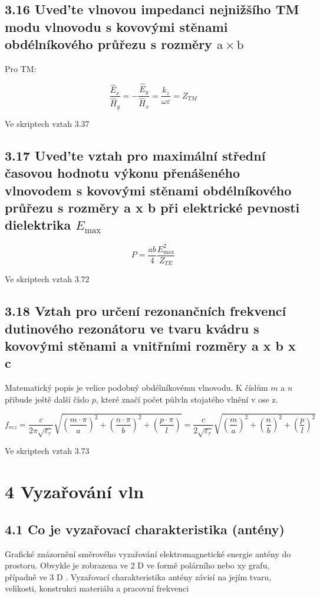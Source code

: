 \documentclass[10pt]{article}
\begin{document}
\subsection*{3.16 Uved'te vlnovou impedanci nejnižšího TM modu vlnovodu s kovovými stěnami obdélníkového průřezu s rozměry $\mathrm{a} \times \mathrm{b}$}

Pro TM:

$$
\frac{\hat{E}_{x}}{\hat{H}_{y}}=-\frac{\hat{E}_{y}}{\hat{H}_{x}}=\frac{k_{z}}{\omega \varepsilon}=Z_{T M}
$$

Ve skriptech vztah 3.37\\
\subsection*{3.17 Uved'te vztah pro maximální střední časovou hodnotu výkonu přenášeného vlnovodem s kovovými stěnami obdélníkového průřezu s rozměry a x b při elektrické pevnosti dielektrika $E_{\text {max }}$}

$$
P=\frac{a b}{4} \frac{E_{\max }^{2}}{Z_{T E}}
$$

Ve skriptech vztah 3.72

\subsection*{3.18 Vztah pro určení rezonančních frekvencí dutinového rezonátoru ve tvaru kvádru s kovovými stěnami a vnitřními rozměry a x b x c}
Matematický popis je velice podobný obdélníkovému vlnovodu. K číslům $m$ a $n$ přibude ještě další číslo $p$, které značí počet půlvln stojatého vlnění v ose z.

$$
f_{r e z}=\frac{c}{2 \pi \sqrt{\varepsilon_{r}}} \sqrt{\left(\frac{m \cdot \pi}{a}\right)^{2}+\left(\frac{n \cdot \pi}{b}\right)^{2}+\left(\frac{p \cdot \pi}{l}\right)}=\frac{c}{2 \sqrt{\varepsilon_{r}}} \sqrt{\left(\frac{m}{a}\right)^{2}+\left(\frac{n}{b}\right)^{2}+\left(\frac{p}{l}\right)^{2}}
$$

Ve skriptech vztah 3.73

\section*{4 Vyzařování vln}
\subsection*{4.1 Co je vyzařovací charakteristika (antény)}
Grafické znázornění směrového vyzařování elektromagnetické energie antény do prostoru. Obvykle je zobrazena ve 2 D ve formě polárního nebo xy grafu, případně ve 3 D . Vyzařovací charakteristika antény závisí na jejím tvaru, velikosti, konstrukci materiálu a pracovní frekvenci
\end{document}
